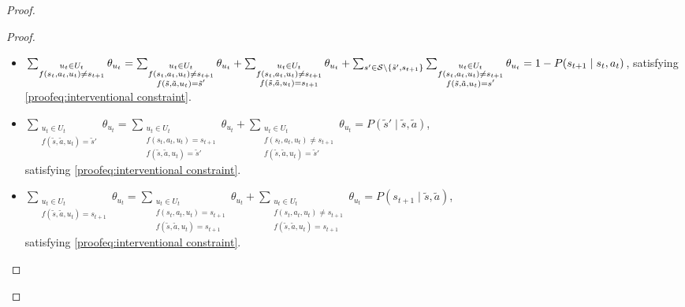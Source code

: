 \begin{proof}
\begin{proof}
\begin{itemize}
    \item $\sum_{\substack{u_t \in U_t\\f(s_t, a_t, u_t) \neq s_{t+1}}}{\theta_{u_t}} = \sum_{\substack{u_t \in U_t \\f(s_t, a_t, u_t) \neq s_{t+1} \\ f(\tilde{s}, \tilde{a}, u_t) = \tilde{s}'}} \theta_{u_t} + \sum_{\substack{u_t \in U_t \\f(s_t, a_t, u_t) \neq s_{t+1} \\ f(\tilde{s}, \tilde{a}, u_t) = s_{t+1}}} \theta_{u_t} + \sum_{s' \in \mathcal{S}\setminus\{\tilde{s}', s_{t+1}\}}\sum_{\substack{u_t \in U_t \\f(s_t, a_t, u_t) \neq s_{t+1} \\ f(\tilde{s}, \tilde{a}, u_t) = s'}}{\theta_{u_t}} \\=1 -
    P(s_{t+1} \mid s_t, a_t)$, satisfying \eqref{proofeq:interventional constraint}.
    
    \item $\sum_{\substack{u_t \in U_t \\f(\tilde{s}, \tilde{a}, u_t) = \tilde{s}'}} \theta_{u_t} = \sum_{\substack{u_t \in U_t \\f(s_t, a_t, u_t) = s_{t+1} \\ f(\tilde{s}, \tilde{a}, u_t) = \tilde{s}'}} \theta_{u_t} + \sum_{\substack{u_t \in U_t \\f(s_t, a_t, u_t) \neq s_{t+1} \\ f(\tilde{s}, \tilde{a}, u_t) = \tilde{s}'}} \theta_{u_t} = P(\tilde{s}' \mid \tilde{s}, \tilde{a})$, \\satisfying \eqref{proofeq:interventional constraint}.

    \item $\sum_{\substack{u_t \in U_t \\f(\tilde{s}, \tilde{a}, u_t) = s_{t+1}}} \theta_{u_t} = \sum_{\substack{u_t \in U_t \\f(s_t, a_t, u_t) = s_{t+1} \\ f(\tilde{s}, \tilde{a}, u_t) = s_{t+1}}} \theta_{u_t} + \sum_{\substack{u_t \in U_t \\f(s_t, a_t, u_t) \neq s_{t+1} \\ f(\tilde{s}, \tilde{a}, u_t) = s_{t+1}}} \theta_{u_t} = P(s_{t+1} \mid \tilde{s}, \tilde{a})$, \\satisfying \eqref{proofeq:interventional constraint}.
    

\end{itemize}
\end{proof}
\end{proof}
